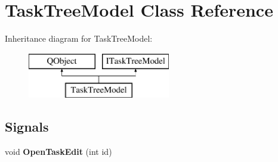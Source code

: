 \hypertarget{class_task_tree_model}{}\section{Task\+Tree\+Model Class Reference}
\label{class_task_tree_model}
Inheritance diagram for Task\+Tree\+Model\+:\begin{figure}[H]
\begin{center}
\leavevmode
\includegraphics[height=2.000000cm]{class_task_tree_model}
\end{center}
\end{figure}
\subsection*{Signals}
\begin{DoxyCompactItemize}
\item 
\mbox{\label{class_task_tree_model_a84903b8013728be8447018eaca9d5d40}} 
void {\bfseries Open\+Task\+Edit} (int id)
\end{DoxyCompactItemize}
